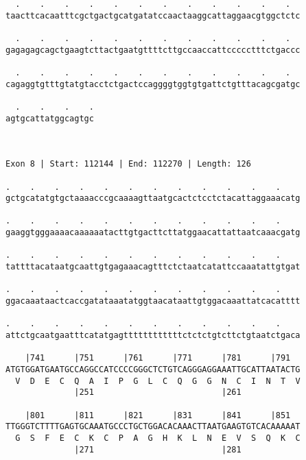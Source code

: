\documentclass{article}
\begin{document}
\begin{Verbatim}
  .    .    .    .    .    .    .    .    .    .    .    .  
taacttcacaatttcgctgactgcatgatatccaactaaggcattaggaacgtggctctc
                                                            
  .    .    .    .    .    .    .    .    .    .    .    .  
gagagagcagctgaagtcttactgaatgttttcttgccaaccattccccctttctgaccc
                                                            
  .    .    .    .    .    .    .    .    .    .    .    .  
cagaggtgtttgtatgtacctctgactccaggggtggtgtgattctgtttacagcgatgc
                                                            
  .    .    .    .
agtgcattatggcagtgc
                  
                  
 
Exon 8 | Start: 112144 | End: 112270 | Length: 126
 
.    .    .    .    .    .    .    .    .    .    .    .    
gctgcatatgtgctaaaacccgcaaaagttaatgcactctcctctacattaggaaacatg
                                                            
.    .    .    .    .    .    .    .    .    .    .    .    
gaaggtgggaaaacaaaaaatacttgtgacttcttatggaacattattaatcaaacgatg
                                                            
.    .    .    .    .    .    .    .    .    .    .    .    
tattttacataatgcaattgtgagaaacagtttctctaatcatattccaaatattgtgat
                                                            
.    .    .    .    .    .    .    .    .    .    .    .    
ggacaaataactcaccgatataaatatggtaacataattgtggacaaattatcacatttt
                                                            
.    .    .    .    .    .    .    .    .    .    .    .    
attctgcaatgaatttcatatgagttttttttttttctctctgtcttctgtaatctgaca
                                                            
    |741      |751      |761      |771      |781      |791  
ATGTGGATGAATGCCAGGCCATCCCCGGGCTCTGTCAGGGAGGAAATTGCATTAATACTG
  V  D  E  C  Q  A  I  P  G  L  C  Q  G  G  N  C  I  N  T  V
              |251                          |261            
  
    |801      |811      |821      |831      |841      |851  
TTGGGTCTTTTGAGTGCAAATGCCCTGCTGGACACAAACTTAATGAAGTGTCACAAAAAT
  G  S  F  E  C  K  C  P  A  G  H  K  L  N  E  V  S  Q  K  C
              |271                          |281            
  

\end{Verbatim}
\end{document}
